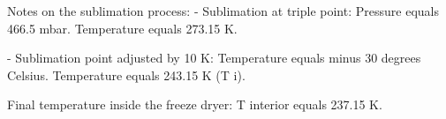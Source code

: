 Notes on the sublimation process:  
- Sublimation at triple point:  
Pressure equals 466.5 mbar.  
Temperature equals 273.15 K.  

- Sublimation point adjusted by 10 K:  
Temperature equals minus 30 degrees Celsius.  
Temperature equals 243.15 K (T i).  

Final temperature inside the freeze dryer:  
T interior equals 237.15 K.